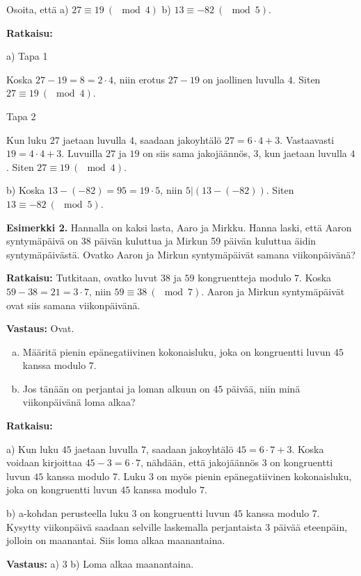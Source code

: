 \begin{esimerkki}
Osoita, että a) $27 \equiv 19 \ (\mod 4)$ b) $13 \equiv -82 \ (\mod 5)$.

{\bf Ratkaisu:}

a) Tapa 1

Koska $27 - 19 = 8 = 2\cdot 4$, niin erotus $27-19$ on jaollinen luvulla $4$. Siten $27 \equiv 19 \ (\mod 4)$.

Tapa 2

Kun luku $27$ jaetaan luvulla $4$, saadaan jakoyhtälö $27 = 6 \cdot 4 + 3$. Vastaavasti $19 = 4 \cdot 4 + 3$. Luvuilla $27$ ja $19$ on siis sama jakojäännös, $3$, kun jaetaan luvulla $4$. Siten $27 \equiv 19\ (\mod 4)$.

b) Koska $13 - (-82) = 95 = 19 \cdot 5$, niin $5 | (13 - (-82))$. Siten $13 \equiv -82 \ (\mod 5)$.


{\bf Esimerkki 2.}
Hannalla on kaksi lasta, Aaro ja Mirkku. Hanna laski, että Aaron syntymäpäivä on 38 päivän kuluttua  ja Mirkun 59 päivän kuluttua äidin syntymäpäivästä. Ovatko Aaron ja Mirkun syntymäpäivät samana viikonpäivänä?

{\bf Ratkaisu:}
Tutkitaan, ovatko luvut $38$ ja $59$ kongruentteja modulo $7$. Koska $59 - 38 = 21 = 3\cdot 7$, niin $59 \equiv 38\ (\mod 7)$. Aaron ja Mirkun syntymäpäivät ovat siis  samana viikonpäivänä.

{\bf Vastaus:} Ovat.
\end{esimerkki}

\vspace*{50pt}
\begin{esimerkki}
\begin{enumerate}[a)]
\item Määritä pienin epänegatiivinen kokonaisluku, joka on kongruentti luvun $45$ kanssa modulo $7$.
\item Jos tänään on perjantai ja loman alkuun on $45$ päivää, niin minä viikonpäivänä loma alkaa?
\end{enumerate}

{\bf Ratkaisu:}

a)
Kun luku $45$ jaetaan luvulla $7$, saadaan jakoyhtälö $45 = 6 \cdot 7 + 3$. Koska voidaan kirjoittaa $45 - 3 = 6 \cdot 7$, nähdään, että jakojäännös $3$ on kongruentti luvun $45$ kanssa modulo 7. Luku $3$ on myös pienin epänegatiivinen kokonaisluku, joka on kongruentti luvun $45$ kanssa modulo $7$.

b)
a-kohdan perusteella luku $3$ on kongruentti luvun $45$ kanssa modulo $7$. Kysytty viikonpäivä saadaan selville laskemalla perjantaista $3$ päivää eteenpäin, jolloin on maanantai. Siis loma alkaa maanantaina. 

{\bf Vastaus:} a) 3 b) Loma alkaa maanantaina.
\end{esimerkki}

